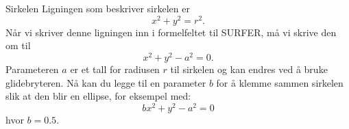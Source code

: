 \begin{surferPage}{Sirkelen}
Ligningen som beskriver sirkelen er		
\[x^2+y^2=r^2.\]
Når vi skriver denne ligningen inn i formelfeltet til SURFER, må vi skrive den om til
\[x^2+y^2-a^2=0.\]
Parameteren $a$ er et tall for radiusen $r$ til sirkelen og kan endres ved å bruke glidebryteren.
 Nå kan du legge til en parameter $b$ for å klemme sammen sirkelen slik at den blir en ellipse, 
 for eksempel med:
\[bx^2+y^2-a^2=0\] hvor $b=0.5$.
\end{surferPage}
